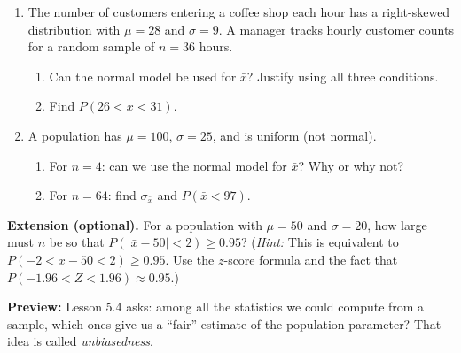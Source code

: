 \documentclass[10pt]{article}
\begin{document}
\begin{enumerate}
  \boxguard[22]
  \item The number of customers entering a coffee shop each hour has a right-skewed
        distribution with $\mu = 28$ and $\sigma = 9$. A manager tracks hourly customer
        counts for a random sample of $n = 36$ hours.
        \begin{enumerate}[label=\alph*.]
          \item Can the normal model be used for $\bar{x}$? Justify using all three conditions.
          \item Find $P(26 < \bar{x} < 31)$.\gradedbelow[r]{0.9in-0.33in}{\gradedblank[id=hw2b, type=short, points=2, answer=0.8854, check=numeric, tolerance=0.003]{0.9in}{0.28in}}
                \vspace{0.9in}
        \end{enumerate}

  \boxguard[22]
  \item A population has $\mu = 100$, $\sigma = 25$, and is uniform (not normal).
        \begin{enumerate}[label=\alph*.]
          \item For $n = 4$: can we use the normal model for $\bar{x}$? Why or why not?
          \item For $n = 64$: find $\sigma_{\bar{x}}$ and $P(\bar{x} < 97)$.
                \vspace{0.9in}
        \end{enumerate}

\end{enumerate}

\begin{extensionbox}
\textbf{Extension (optional).}
For a population with $\mu = 50$ and $\sigma = 20$, how large must $n$ be so that
$P(|\bar{x} - 50| < 2) \ge 0.95$? (\textit{Hint:} This is equivalent to $P(-2 < \bar{x} - 50 < 2) \ge 0.95$.
Use the $z$-score formula and the fact that $P(-1.96 < Z < 1.96) \approx 0.95$.)
\end{extensionbox}

\begin{reflectionbox}
\textbf{Preview:} Lesson 5.4 asks: among all the statistics we could compute from a sample, which ones give us a ``fair'' estimate of the population parameter? That idea is called \emph{unbiasedness}.
\end{reflectionbox}
\end{document}

